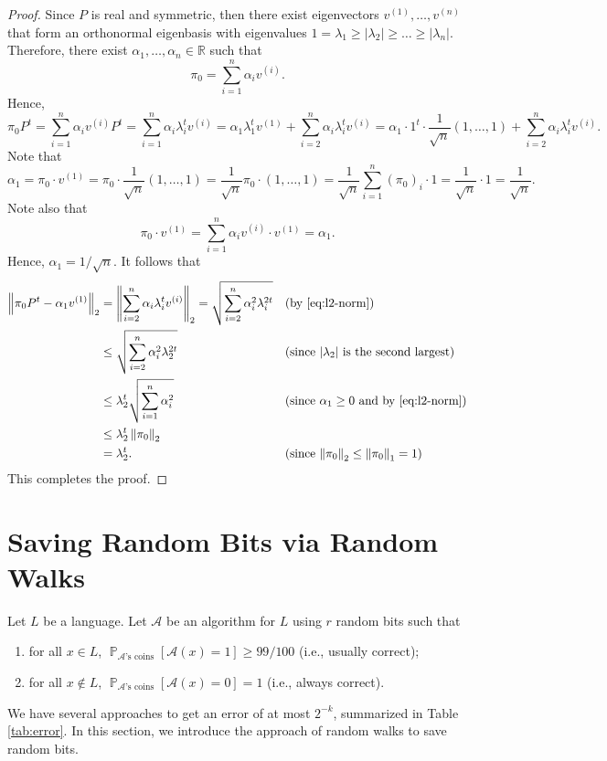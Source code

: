 \documentclass[letterpaper, reqno,11pt]{article}
\newcommand{\RR}{\mathbb{R}}
\newcommand{\PP}{\mathop{{}\mathbb{P}}}
\begin{document}
\begin{proof}
  Since $P$ is real and symmetric, then there exist eigenvectors $v^{(1)}, \ldots, v^{(n)}$ that form an orthonormal eigenbasis with eigenvalues $1 = \lambda_1 \geq |\lambda_2| \geq \ldots \geq |\lambda_n|$. Therefore, there exist $\alpha_1, \ldots, \alpha_n \in \RR$ such that
  $$ \pi_0 = \sum_{i = 1}^n \alpha_i v^{(i)}. $$
  Hence,
  $$ \pi_0 P^t = \sum_{i = 1}^n \alpha_i v^{(i)} P^t = \sum_{i = 1}^n \alpha_i \lambda_i^t v^{(i)} = \alpha_1 \lambda_1^t v^{(1)} + \sum_{i = 2}^n \alpha_i \lambda_i^t v^{(i)} = \alpha_1 \cdot 1^t \cdot \frac{1}{\sqrt{n}} (1, \ldots, 1) + \sum_{i = 2}^n \alpha_i \lambda_i^t v^{(i)}. $$
  Note that
  $$ \alpha_1 = \pi_0 \cdot v^{(1)} = \pi_0 \cdot \frac{1}{\sqrt{n}} (1, \ldots, 1) = \frac{1}{\sqrt{n}} \pi_0 \cdot (1, \ldots, 1) = \frac{1}{\sqrt{n}} \sum_{i = 1}^n \left(\pi_0\right)_i \cdot 1 = \frac{1}{\sqrt{n}} \cdot 1 = \frac{1}{\sqrt{n}}. $$
  Note also that
  $$ \pi_0 \cdot v^{(1)} = \sum_{i = 1}^n \alpha_i v^{(i)} \cdot v^{(1)} = \alpha_1. $$
  Hence, $\alpha_1 = 1/\sqrt{n}$. It follows that
  \begin{align*}
    \left\| \pi_0 P^t - \alpha_1 v^{(1)} \right\|_2 &= \left\| \sum_{i = 2}^n \alpha_i \lambda_i^t v^{(i)} \right\|_2 = \sqrt{\sum_{i = 2}^n \alpha_i^2 \lambda_i^{2t}} && (\text{by \eqref{eq:l2-norm}}) \\
    &\leq \sqrt{\sum_{i = 2}^n \alpha_i^2 \lambda_2^{2t}} && \text{(since $\left|\lambda_2\right|$ is the second largest)} \\
    &\leq \lambda_2^t \sqrt{\sum_{i = 1}^n \alpha_i^2} && \text{(since $\alpha_1 \geq 0$ and by \eqref{eq:l2-norm})} \\
    &\leq \lambda_2^t \left\| \pi_0 \right\|_2 \\
    &= \lambda_2^t. && \text{(since $\left\| \pi_0 \right\|_2 \leq \left\| \pi_0 \right\|_1 = 1$)}
  \end{align*}
  This completes the proof.
\end{proof}

\section{Saving Random Bits via Random Walks}

Let $L$ be a language. Let $\mathcal A$ be an algorithm for $L$ using $r$ random bits such that
\begin{enumerate}[itemsep=0pt, label=(\roman*)]
  \item for all $x \in L$, $\PP_\text{$\mathcal A$'s coins}[\mathcal A(x) = 1] \geq 99/100$ (i.e., usually correct);
  \item for all $x \not \in L$, $\PP_\text{$\mathcal A$'s coins}[\mathcal A(x) = 0] = 1$ (i.e., always correct).
\end{enumerate}
We have several approaches to get an error of at most $2^{-k}$, summarized in Table \ref{tab:error}. In this section, we introduce the approach of random walks to save random bits.
\end{document}
